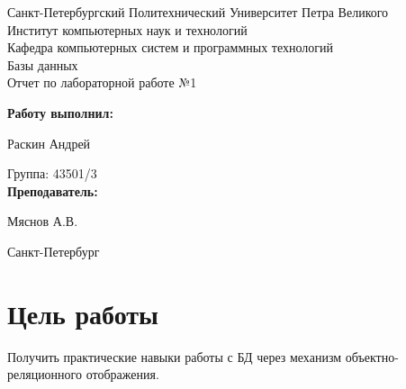 \documentclass[a4paper]{article}
\begin{document}
\begin{titlepage} %

\begin{center} %

\large Санкт-Петербургский Политехнический Университет Петра Великого\\
\large Институт компьютерных наук и технологий \\
\large Кафедра компьютерных систем и программных технологий\\[6cm]

\huge Базы данных\\[0.5cm] %
\large Отчет по лабораторной работе №1\\[0.1cm]
\end{center}

\begin{flushright}
\begin{minipage}{0.5\textwidth}
\begin{flushright}
\textbf{Работу выполнил:}

Раскин Андрей

{Группа:} 43501/3\\


\textbf{Преподаватель:} 

Мяснов А.В.
\end{flushright}
\end{minipage} %
\end{flushright} %

\vfill %

\begin{center}

\large Санкт-Петербург\\
\large \the\year %

\end{center} %

\thispagestyle{empty} %
\end{titlepage} %

\vfill %

\section{Цель работы}
Получить практические навыки работы с БД через механизм объектно-реляционного отображения.
\end{document}
